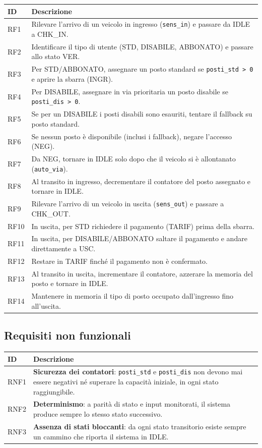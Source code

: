 \begin{longtable}{@{}p{1.3cm}p{12cm}@{}}
\toprule
\textbf{ID} & \textbf{Descrizione} \\
\midrule
\endhead
RF1  & Rilevare l'arrivo di un veicolo in ingresso (\texttt{sens\_in}) e passare da IDLE a CHK\_IN. \\
RF2  & Identificare il tipo di utente (STD, DISABILE, ABBONATO) e passare allo stato VER. \\
RF3  & Per STD/ABBONATO, assegnare un posto standard se \texttt{posti\_std > 0} e aprire la sbarra (INGR). \\
RF4  & Per DISABILE, assegnare in via prioritaria un posto disabile se \texttt{posti\_dis > 0}. \\
RF5  & Se per un DISABILE i posti disabili sono esauriti, tentare il fallback su posto standard. \\
RF6  & Se nessun posto è disponibile (inclusi i fallback), negare l'accesso (NEG). \\
RF7  & Da NEG, tornare in IDLE solo dopo che il veicolo si è allontanato (\texttt{auto\_via}). \\
RF8  & Al transito in ingresso, decrementare il contatore del posto assegnato e tornare in IDLE. \\
RF9  & Rilevare l'arrivo di un veicolo in uscita (\texttt{sens\_out}) e passare a CHK\_OUT. \\
RF10 & In uscita, per STD richiedere il pagamento (TARIF) prima della sbarra. \\
RF11 & In uscita, per DISABILE/ABBONATO saltare il pagamento e andare direttamente a USC. \\
RF12 & Restare in TARIF finché il pagamento non è confermato. \\
RF13 & Al transito in uscita, incrementare il contatore, azzerare la memoria del posto e tornare in IDLE. \\
RF14 & Mantenere in memoria il tipo di posto occupato dall'ingresso fino all'uscita. \\
\bottomrule
\end{longtable}

\subsection{Requisiti non funzionali}

\begin{longtable}{@{}p{1.3cm}p{12cm}@{}}
\toprule
\textbf{ID} & \textbf{Descrizione} \\
\midrule
\endhead
RNF1 & \textbf{Sicurezza dei contatori}: \texttt{posti\_std} e \texttt{posti\_dis} non devono mai essere negativi né superare la capacità iniziale, in ogni stato raggiungibile. \\
RNF2 & \textbf{Determinismo}: a parità di stato e input monitorati, il sistema produce sempre lo stesso stato successivo. \\
RNF3 & \textbf{Assenza di stati bloccanti}: da ogni stato transitorio esiste sempre un cammino che riporta il sistema in IDLE. \\
\bottomrule
\end{longtable}

